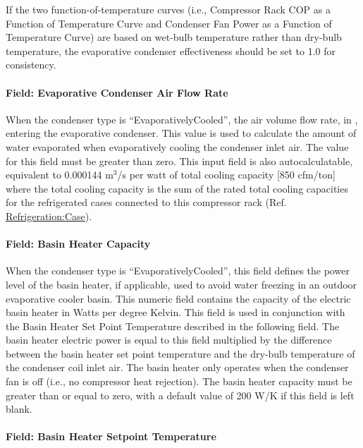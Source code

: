 If the two function-of-temperature curves (i.e., Compressor Rack COP as a Function of Temperature Curve and Condenser Fan Power as a Function of Temperature Curve) are based on wet-bulb temperature rather than dry-bulb temperature, the evaporative condenser effectiveness should be set to 1.0 for consistency.

\paragraph{Field: Evaporative Condenser Air Flow Rate}\label{field-evaporative-condenser-air-flow-rate-001}

When the condenser type is ``EvaporativelyCooled'', the air volume flow rate, in \si{\volumeFlowRate}, entering the evaporative condenser. This value is used to calculate the amount of water evaporated when evaporatively cooling the condenser inlet air. The value for this field must be greater than zero. This input field is also autocalculatable, equivalent to 0.000144 m\(^{3}\)/s per watt of total cooling capacity {[}850 cfm/ton{]} where the total cooling capacity is the sum of the rated total cooling capacities for the refrigerated cases connected to this compressor rack (Ref. \hyperref[refrigerationcase]{Refrigeration:Case}).

\paragraph{Field: Basin Heater Capacity}\label{field-basin-heater-capacity-003}

When the condenser type is ``EvaporativelyCooled'', this field defines the power level of the basin heater, if applicable, used to avoid water freezing in an outdoor evaporative cooler basin. This numeric field contains the capacity of the electric basin heater in Watts per degree Kelvin. This field is used in conjunction with the Basin Heater Set Point Temperature described in the following field. The basin heater electric power is equal to this field multiplied by the difference between the basin heater set point temperature and the dry-bulb temperature of the condenser coil inlet air. The basin heater only operates when the condenser fan is off (i.e., no compressor heat rejection). The basin heater capacity must be greater than or equal to zero, with a default value of 200 W/K if this field is left blank.

\paragraph{Field: Basin Heater Setpoint Temperature}\label{field-basin-heater-setpoint-temperature-003}

